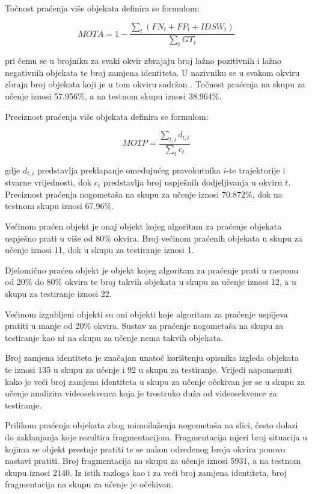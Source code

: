 \documentclass[times, utf8, seminar, numeric]{fer}
\begin{document}
Točnost praćenja više objekata definira se formulom:

\[MOTA = 1- \frac{\sum_{t}(FN_t + FP_t + IDSW_t)}{\sum_{t} GT_t}\]

pri čemu se u brojniku za svaki okvir zbrajaju broj lažno pozitivnih i lažno negativnih objekata te broj zamjena identiteta. U nazivniku se u svakom okviru zbraja broj objekata koji je u tom okviru sadržan \cite{MOT16}. Točnost praćenja na skupu za učenje iznosi 57.956\%, a na testnom skupu iznosi 38.964\%.


Preciznost praćenja više objekata definira se formulom:

\[MOTP = \frac{\sum_{t,i} d_{t,i}}{\sum_{t} c_t}\]

gdje \(d_{t,i}\) predstavlja preklapanje omeđujućeg pravokutnika \(i\)-te trajektorije i stvarne vrijednosti, dok \(c_t\) predstavlja broj uspješnih dodjeljivanja u okviru \(t\)\cite{MOT16}. Preciznost praćenja nogometaša na skupu za učenje iznosi 70.872\%, dok na testnom skupu iznosi 67.96\%.


Većinom praćen objekt je onaj objekt kojeg algoritam za praćenje objekata uspješno prati u više od 80\% okvira\cite{MOT16}. Broj većinom praćenih objekata u skupu za učenje iznosi 11, dok u skupu za testiranje iznosi 1.

Djelomično praćen objekt je objekt kojeg algoritam za praćenje prati u rasponu od 20\% do 80\% okvira\cite{MOT16} te broj takvih objekata u skupu za učenje iznosi 12, a u skupu za testiranje iznosi 22.

Većinom izgubljeni objekti su oni objekti koje algoritam za praćenje uspijeva pratiti u manje od 20\% okvira\cite{MOT16}. Sustav za praćenje nogometaša na skupu za testiranje kao ni na skupu za učenje nema takvih objekata.

Broj zamjena identiteta je značajan unatoč korištenju opisnika izgleda objekata te iznosi 135 u skupu za učenje i 92 u skupu za testiranje. Vrijedi napomenuti kako je veći broj zamjena identiteta u skupu za učenje očekivan jer se u skupu za učenje analizira videosekvenca koja je trostruko duža od videosekvence za testiranje.

Prilikom praćenja objekata zbog mimoilaženja nogometaša na slici, često dolazi do zaklanjanja koje rezultira fragmentacijom. Fragmentacija mjeri broj situacija u kojima se objekt prestaje pratiti te se nakon određenog broja okvira ponovo nastavi pratiti\cite{MOT16}. Broj fragmentacija na skupu za učenje iznosi 5931, a na testnom skupu iznosi 2140. Iz istih razloga kao i za veći broj zamjena identiteta, broj fragmentacija na skupu za učenje je očekivan.
\end{document}

